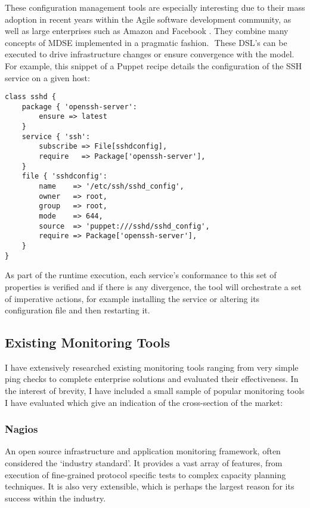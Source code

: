 \documentclass{cshonours}
\begin{document}
These configuration management tools are especially interesting due to their mass adoption in recent years within the Agile software development community, as well as large enterprises such as Amazon and Facebook \cite{Chef}. They combine many concepts of MDSE implemented in a pragmatic fashion.  These DSL’s can be executed to drive infrastructure changes or ensure convergence with the model. For example, this snippet of a Puppet recipe details the configuration of the SSH service on a given host:

\begin{verbatim}
class sshd { 
    package { 'openssh-server': 
        ensure => latest 
    } 
    service { 'ssh': 
        subscribe => File[sshdconfig], 
        require   => Package['openssh-server'], 
    } 
    file { 'sshdconfig': 
        name    => '/etc/ssh/sshd_config', 
        owner   => root, 
        group   => root, 
        mode    => 644, 
        source  => 'puppet:///sshd/sshd_config', 
        require => Package['openssh-server'], 
    } 
}
\end{verbatim}

As part of the runtime execution, each service’s conformance to this set of properties is verified and if there is any divergence, the tool will orchestrate a set of imperative actions, for example installing the service or altering its configuration file and then restarting it.

\subsection{Existing Monitoring Tools}

I have extensively researched existing monitoring tools ranging from very simple ping checks to complete enterprise solutions and evaluated their effectiveness. In the interest of brevity, I have included a small sample of popular monitoring tools I have evaluated which give an indication of the cross-section of the market:

\subsubsection{Nagios}

An open source infrastructure and application monitoring framework, often considered the ‘industry standard’. It provides a vast array of features, from execution of fine-grained protocol specific tests to complex capacity planning techniques. It is also very extensible, which is perhaps the largest reason for its success within the industry.
\end{document}
